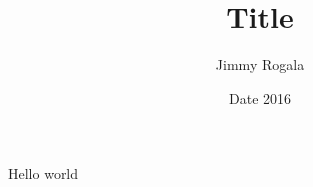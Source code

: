\documentclass[11pt]{article}
\title{Title}
\author{Jimmy Rogala}
\date{Date 2016}
\begin{document}
  Hello world
\end{document}
